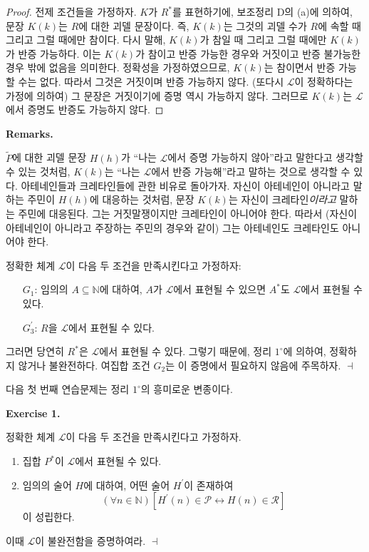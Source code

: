 \documentclass[12pt]{paper}
\newenvironment{context}[1][]
{ \noindent \textbf{{#1}.}
}
{ \hfill $ \dashv $
}
\begin{document}
  \begin{proof}
    전제 조건들을 가정하자.
    $K$가 $R^{*}$를 표현하기에, 보조정리 D의 (a)에 의하여,
    문장 $K \left( k \right)$는 $R$에 대한 괴델 문장이다.
    즉, $K \left( k \right)$는 그것의 괴델 수가 $R$에 속할 때 그리고 그럴 때에만 참이다.
    다시 말해, $K \left( k \right)$가 참일 때 그리고 그럴 때에만 $K \left( k \right)$가 반증 가능하다.
    이는 $K \left( k \right)$가 참이고 반증 가능한 경우와 거짓이고 반증 불가능한 경우 밖에 없음을 의미한다.
    정확성을 가정하였으므로, $K \left( k \right)$는 참이면서 반증 가능할 수는 없다.
    따라서 그것은 거짓이며 반증 가능하지 않다.
    (또다시 $\mathcal{L}$이 정확하다는 가정에 의하여) 그 문장은 거짓이기에 증명 역시 가능하지 않다.
    그러므로 $K \left( k \right)$는 $\mathcal{L}$에서 증명도 반증도 가능하지 않다.
  \end{proof}

  \begin{context}[Remarks]
    $\tilde{P}$에 대한 괴델 문장 $H \left( h \right)$가 ``나는 $\mathcal{L}$에서 증명 가능하지 않아''라고 말한다고 생각할 수 있는 것처럼,
    $K \left( k \right)$는 ``나는 $\mathcal{L}$에서 반증 가능해''라고 말하는 것으로 생각할 수 있다.
    아테네인들과 크레타인들에 관한 비유로 돌아가자.
    자신이 아테네인이 아니라고 말하는 주민이 $H \left( h \right)$에 대응하는 것처럼,
    문장 $K \left( k \right)$는 자신이 크레타인\textit{이라고} 말하는 주민에 대응된다.
    그는 거짓말쟁이지만 크레타인이 아니어야 한다.
    따라서 (자신이 아테네인이 아니라고 주장하는 주민의 경우와 같이) 그는 아테네인도 크레타인도 아니어야 한다.

    정확한 체계 $\mathcal{L}$이 다음 두 조건을 만족시킨다고 가정하자:
    \begin{itemize}
      \item[$G_{1}$:] 임의의 $A \subseteq \mathbb{N}$에 대하여, $A$가 $\mathcal{L}$에서 표현될 수 있으면 $A^{*}$도 $\mathcal{L}$에서 표현될 수 있다.
      \item[$G_{3}^{\prime}$:] $R$을 $\mathcal{L}$에서 표현될 수 있다.
    \end{itemize}

    그러면 당연히 $R^{*}$은 $\mathcal{L}$에서 표현될 수 있다.
    그렇기 때문에, 정리 $1^{\circ}$에 의하여, 정확하지 않거나 불완전하다.
    여집합 조건 $G_{2}$는 이 증명에서 필요하지 않음에 주목하자.
  \end{context}

  다음 첫 번째 연습문제는 정리 $1^{\circ}$의 흥미로운 변종이다.

  \begin{context}[Exercise 1]
    정확한 체계 $\mathcal{L}$이 다음 두 조건을 만족시킨다고 가정하자.
    \begin{enumerate}
      \item 집합 $P^{*}$이 $\mathcal{L}$에서 표현될 수 있다.
      \item 임의의 술어 $H$에 대하여, 어떤 술어 $H^{\prime}$이 존재하여 $$\left( \forall n \in \mathbb{N} \right) \left[ H^{\prime} \left( n \right) \in \mathcal{P} \leftrightarrow H \left( n \right) \in \mathcal{R} \right]$$이 성립한다.
    \end{enumerate}

    이때 $\mathcal{L}$이 불완전함을 증명하여라.
  \end{context}
\end{document}
